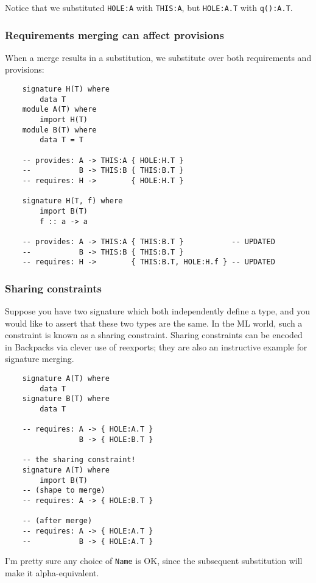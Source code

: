 \documentclass{article}
\newcommand{\Red}[1]{{\color{red} #1}}
\begin{document}
Notice that we substituted \verb|HOLE:A| with \verb|THIS:A|, but \verb|HOLE:A.T| with \verb|q():A.T|.

\subsubsection{Requirements merging can affect provisions}

When a merge results in a substitution, we substitute over both
requirements and provisions:

\begin{verbatim}
    signature H(T) where
        data T
    module A(T) where
        import H(T)
    module B(T) where
        data T = T

    -- provides: A -> THIS:A { HOLE:H.T }
    --           B -> THIS:B { THIS:B.T }
    -- requires: H ->        { HOLE:H.T }

    signature H(T, f) where
        import B(T)
        f :: a -> a

    -- provides: A -> THIS:A { THIS:B.T }           -- UPDATED
    --           B -> THIS:B { THIS:B.T }
    -- requires: H ->        { THIS:B.T, HOLE:H.f } -- UPDATED
\end{verbatim}

\subsubsection{Sharing constraints}

Suppose you have two signature which both independently define a type,
and you would like to assert that these two types are the same.  In the
ML world, such a constraint is known as a sharing constraint.  Sharing
constraints can be encoded in Backpacks via clever use of reexports;
they are also an instructive example for signature merging.

\begin{verbatim}
    signature A(T) where
        data T
    signature B(T) where
        data T

    -- requires: A -> { HOLE:A.T }
                 B -> { HOLE:B.T }

    -- the sharing constraint!
    signature A(T) where
        import B(T)
    -- (shape to merge)
    -- requires: A -> { HOLE:B.T }

    -- (after merge)
    -- requires: A -> { HOLE:A.T }
    --           B -> { HOLE:A.T }
\end{verbatim}
%
\Red{I'm pretty sure any choice of \texttt{Name} is OK, since the
subsequent substitution will make it alpha-equivalent.}
\end{document}
